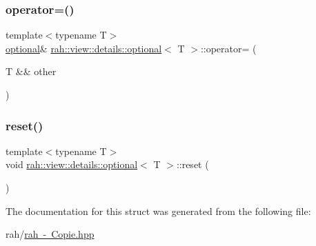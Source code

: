\subsubsection{\texorpdfstring{operator=()}{operator=()}\hspace{0.1cm}{\footnotesize\ttfamily [4/4]}}
{\footnotesize\ttfamily template$<$typename T$>$ \\
\mbox{\hyperlink{structrah_1_1view_1_1details_1_1optional}{optional}}\& \mbox{\hyperlink{structrah_1_1view_1_1details_1_1optional}{rah\+::view\+::details\+::optional}}$<$ T $>$\+::operator= (\begin{DoxyParamCaption}\item[{T \&\&}]{other }\end{DoxyParamCaption})\hspace{0.3cm}{\ttfamily [inline]}}

\mbox{\label{structrah_1_1view_1_1details_1_1optional_a3df63c25ba76b31c003c2faa70554ae7}} 
\subsubsection{\texorpdfstring{reset()}{reset()}}
{\footnotesize\ttfamily template$<$typename T$>$ \\
void \mbox{\hyperlink{structrah_1_1view_1_1details_1_1optional}{rah\+::view\+::details\+::optional}}$<$ T $>$\+::reset (\begin{DoxyParamCaption}{ }\end{DoxyParamCaption})\hspace{0.3cm}{\ttfamily [inline]}}



The documentation for this struct was generated from the following file\+:\begin{DoxyCompactItemize}
\item 
rah/\mbox{\hyperlink{rah_01-_01_copie_8hpp}{rah -\/ Copie.\+hpp}}\end{DoxyCompactItemize}
